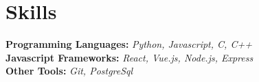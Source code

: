 \documentclass[letterpaper,12pt]{article} %
\begin{document}
\section{Skills}
\begin{itemize}[leftmargin=0.15in, label={}]
  \small{\item{
        \textbf{Programming Languages: }{\emph{Python, Javascript, C, C++}} \\
        \textbf{Javascript Frameworks: }{\emph{React, Vue.js, Node.js, Express}} \\
        \textbf{Other Tools: }{\emph{Git, PostgreSql}} \\
        }}
\end{itemize}

\end{document}
